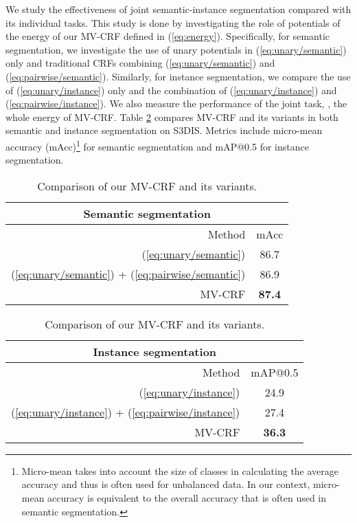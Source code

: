 \documentclass[10pt,twocolumn,letterpaper]{article}
\begin{document}
We study the effectiveness of joint semantic-instance segmentation compared with
its individual tasks. This study is done by investigating the role of potentials
of the energy of our MV-CRF defined in (\ref{eq:energy}). Specifically, for
semantic segmentation, we investigate the use of unary potentials in
(\ref{eq:unary/semantic}) only and traditional CRFs combining
(\ref{eq:unary/semantic}) and (\ref{eq:pairwise/semantic}). Similarly, for
instance segmentation, we compare the use of (\ref{eq:unary/instance}) only and
the combination of (\ref{eq:unary/instance}) and (\ref{eq:pairwise/instance}).
We also measure the performance of the joint task, \ie, the whole energy of
MV-CRF. Table \ref{tab:ablation} compares MV-CRF and its variants in both
semantic and instance segmentation on S3DIS. Metrics include micro-mean accuracy
(mAcc)\footnote{Micro-mean takes into account the size of classes in calculating
  the average accuracy and thus is often used for unbalanced data. In our
  context, micro-mean accuracy is equivalent to the overall accuracy that is
  often used in semantic segmentation.} \cite{sokolova-classification-ipm09} for
semantic segmentation and mAP@0.5 for instance segmentation.

\begin{table}[!ht]
  \begin{minipage}{.45\linewidth}
    \small
    \centering
    \begin{tabular}{rc}
      \multicolumn{2}{c}{Semantic segmentation} \\
      \toprule
      Method & mAcc \\
      \midrule
      (\ref{eq:unary/semantic}) & 86.7 \\
      (\ref{eq:unary/semantic}) + (\ref{eq:pairwise/semantic}) & 86.9 \\
      MV-CRF & \textbf{87.4} \\
      \bottomrule
    \end{tabular}
  \end{minipage}
  \begin{minipage}{.45\linewidth}
    \small
    \centering
    \begin{tabular}{rc}
      \multicolumn{2}{c}{Instance segmentation} \\
      \toprule
      Method & mAP@0.5 \\
      \midrule
      (\ref{eq:unary/instance}) & 24.9 \\
      (\ref{eq:unary/instance}) + (\ref{eq:pairwise/instance}) & 27.4 \\
      MV-CRF & \textbf{36.3} \\
      \bottomrule
    \end{tabular}
  \end{minipage}
  \caption{Comparison of our MV-CRF and its variants.}
  \label{tab:ablation}
\end{table}
\end{document}
